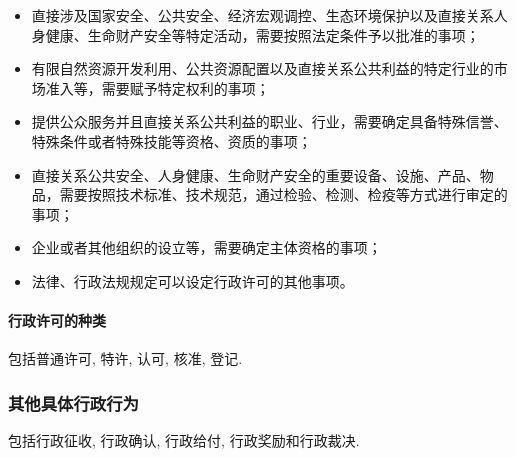 \begin{itemize}
    \item 直接涉及国家安全、公共安全、经济宏观调控、生态环境保护以及直接关系人身健康、生命财产安全等特定活动，需要按照法定条件予以批准的事项；
    \item 有限自然资源开发利用、公共资源配置以及直接关系公共利益的特定行业的市场准入等，需要赋予特定权利的事项；
    \item 提供公众服务并且直接关系公共利益的职业、行业，需要确定具备特殊信誉、特殊条件或者特殊技能等资格、资质的事项；
    \item 直接关系公共安全、人身健康、生命财产安全的重要设备、设施、产品、物品，需要按照技术标准、技术规范，通过检验、检测、检疫等方式进行审定的事项；
    \item 企业或者其他组织的设立等，需要确定主体资格的事项；
    \item 法律、行政法规规定可以设定行政许可的其他事项。
\end{itemize}

\paragraph{行政许可的种类} 包括普通许可, 特许, 认可, 核准, 登记.

\subsubsection{其他具体行政行为} 包括行政征收, 行政确认, 行政给付, 行政奖励和行政裁决.